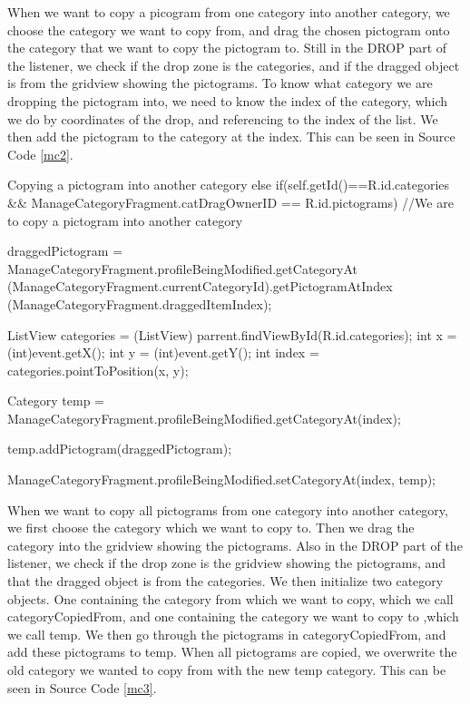 When we want to copy a picogram from one category into another category, we choose the category we want to copy from, and drag the chosen pictogram onto the category that we want to copy the pictogram to. 
Still in the DROP part of the listener, we check if the drop zone is the categories, and if the dragged object is from the gridview showing the pictograms.
To know what category we are dropping the pictogram into, we need to know the index of the category, which we do by coordinates of the drop, and referencing to the index of the list.
We then add the pictogram to the category at the index.
This can be seen in Source Code \ref{mc2}.


\begin{source}[{mc2}]{Copying a pictogram into another category}
else if(self.getId()==R.id.categories && ManageCategoryFragment.catDragOwnerID == R.id.pictograms) //We are to copy a pictogram into another category
				{
					
					draggedPictogram = ManageCategoryFragment.profileBeingModified.getCategoryAt
						(ManageCategoryFragment.currentCategoryId).getPictogramAtIndex
						(ManageCategoryFragment.draggedItemIndex); 
							
					ListView categories = (ListView) parrent.findViewById(R.id.categories);
					int x = (int)event.getX();
					int y = (int)event.getY();
					int index = categories.pointToPosition(x, y);
					
					Category temp = ManageCategoryFragment.profileBeingModified.getCategoryAt(index);
					
					temp.addPictogram(draggedPictogram);
				
					ManageCategoryFragment.profileBeingModified.setCategoryAt(index, temp);
										
				}
\end{source}
When we want to copy all pictograms from one category into another category, we first choose the category which we want to copy to. 
Then we drag the category into the gridview showing the pictograms. 
Also in the DROP part of the listener, we check if the drop zone is the gridview showing the pictograms, and that the dragged object is from the categories.
We then initialize two category objects. 
One containing the category from which we want to copy, which we call categoryCopiedFrom, and one containing the category we want to copy to ,which we call temp. 
We then go through the pictograms in categoryCopiedFrom, and add these pictograms to temp. 
When all pictograms are copied, we overwrite the old category we wanted to copy from with the new temp category. 
This can be seen in Source Code \ref{mc3}.


